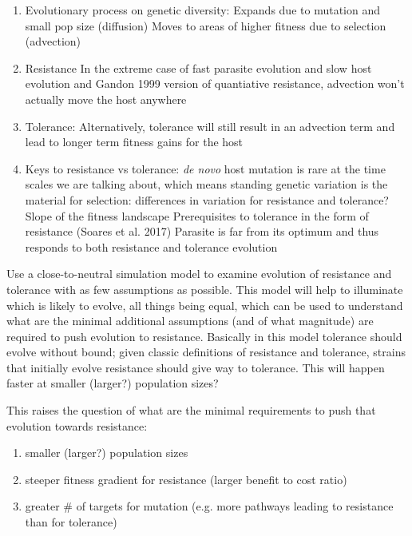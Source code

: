 \documentclass{article}
\begin{document}
\begin{enumerate}
    \item Evolutionary process on genetic diversity:
    \subitem Expands due to mutation and small pop size (diffusion)
    \subitem Moves to areas of higher fitness due to selection (advection) 
    \item Resistance 
    \subitem In the extreme case of fast parasite evolution and slow host evolution and Gandon 1999 version of quantiative resistance, advection won't actually move the host anywhere
    \item Tolerance:
    \subitem Alternatively, tolerance will still result in an advection term and lead to longer term fitness gains for the host
    \item Keys to resistance vs tolerance:
    \subitem \emph{de novo} host mutation is rare at the time scales we are talking about, which means standing genetic variation is the material for selection: differences in variation for resistance and tolerance?
    \subitem Slope of the fitness landscape
    \subitem Prerequisites to tolerance in the form of resistance (Soares et al. 2017)
    \subitem Parasite is far from its optimum and thus responds to both resistance and tolerance evolution
\end{enumerate}

Use a close-to-neutral simulation model to examine evolution of resistance and tolerance with as few assumptions as possible. This model will help to illuminate which is likely to evolve, all things being equal, which can be used to understand what are the minimal additional assumptions (and of what magnitude) are required to push evolution to resistance. Basically in this model tolerance should evolve without bound; given classic definitions of resistance and tolerance, strains that initially evolve resistance should give way to tolerance. This will happen faster at smaller (larger?) population sizes?

This raises the question of what are the minimal requirements to push that evolution towards resistance:
\begin{enumerate}
    \item smaller (larger?) population sizes
    \item steeper fitness gradient for resistance (larger benefit to cost ratio)
    \item greater \# of targets for mutation (e.g. more pathways leading to resistance than for tolerance)
\end{enumerate}
\end{document}
